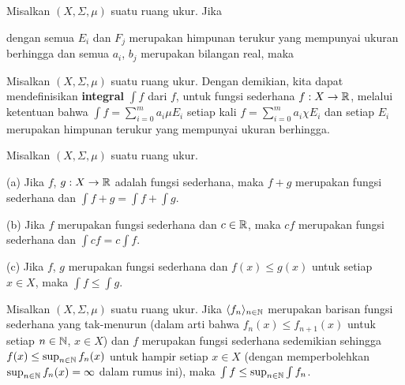  Misalkan $(X,\Sigma,\mu)$ suatu ruang ukur. Jika


\noindent dengan semua $E_i$ dan $F_j$ merupakan
himpunan terukur yang mempunyai ukuran berhingga dan semua $ a_i$, $ b_j$ merupakan bilangan
real, maka




 Misalkan $(X,\Sigma,\mu)$ suatu ruang ukur.
Dengan demikian, kita
dapat mendefinisikan {\bf integral} $\int f$ dari $f$, untuk fungsi sederhana
$f:X\to\Bbb R$, melalui ketentuan bahwa
$\int f=\sum_{i=0}^m a_i\mu E_i$ setiap kali $f=\sum_{i=0}^m a_i\chi
E_i$ dan setiap $E_i$ merupakan himpunan terukur yang mempunyai ukuran berhingga.

 Misalkan $(X,\Sigma,\mu)$ suatu ruang ukur.

(a) Jika $f$, $g:X\to\Bbb R$ adalah fungsi sederhana, maka $f+g$ merupakan
fungsi
sederhana dan $\int f+g=\int f+\int g$.

(b) Jika $f$ merupakan fungsi sederhana dan $c\in\Bbb R$, maka $cf$ merupakan
fungsi
sederhana dan $\int cf=c\int f$.

(c) Jika $f$, $g$ merupakan fungsi sederhana dan $f(x)\le g(x)$ untuk setiap
$x\in
X$, maka $\int f\le \int g$.



 Misalkan $(X,\Sigma,\mu)$ suatu ruang ukur.
Jika $\langle f_n\rangle_{n\in\Bbb N}$ merupakan barisan fungsi sederhana
yang tak-menurun (dalam arti bahwa $f_n(x)\le f_{n+1}(x)$ untuk
setiap $n\in\Bbb N$, $x\in X$) dan $f$ merupakan fungsi sederhana sedemikian sehingga
$f(x)\le\sup_{n\in\Bbb N}f_n(x)$ untuk hampir setiap $x\in X$ (dengan memperbolehkan
$\sup_{n\in\Bbb N}f_n(x)=\infty$ dalam rumus ini), maka
$\int f\le\sup_{n\in\Bbb N}\int f_n$.

